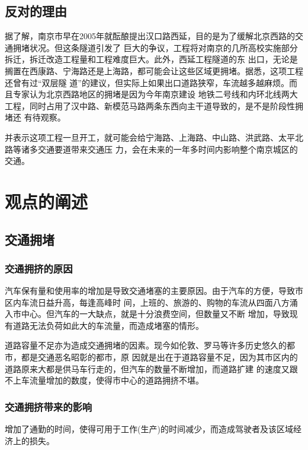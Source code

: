 ﻿\documentclass[11pt,a4paper,onecolumn]{article}
\begin{document}
\subsection{反对的理由}

据了解，南京市早在2005年就酝酿提出汉口路西延，目的是为了缓解北京西路的交通拥堵状况。但这条隧道引发了
巨大的争议，工程将对南京的几所高校实施部分拆迁，拆迁改造工程量和工程难度巨大。此外，西延工程隧道的东
出口，无论是搁置在西康路、宁海路还是上海路，都可能会让这些区域更拥堵。据悉，这项工程还曾有过“双层隧
道”的建议，但实际上如果出口道路狭窄，车流越多越麻烦。而且专家认为北京西路地区的拥堵是因为今年南京建设
地铁二号线和内环北线两大工程，同时占用了汉中路、新模范马路两条东西向主干道导致的，是不是阶段性拥堵还
有待观察。

并表示这项工程一旦开工，就可能会给宁海路、上海路、中山路、洪武路、太平北路等诸多交通要道带来交通压
力，会在未来的一年多时间内影响整个南京城区的交通。

\section{观点的阐述}

\subsection{交通拥堵}

\subsubsection{交通拥挤的原因}

汽车保有量和使用率的增加是导致交通堵塞的主要原因。由于汽车的方便，导致市区内车流日益升高，每逢高峰时
间，上班的、旅游的、购物的车流从四面八方涌入市中心。但汽车的一大缺点，就是十分浪费空间，但数量又不断
增加，导致现有道路无法负荷如此大的车流量，而造成堵塞的情形。

道路容量不足亦为造成交通拥堵的因素。现今如伦敦、罗马等许多历史悠久的都市，都是交通恶名昭彰的都市，原
因就是出在于道路容量不足，因为其市区内的道路原来大都是供马车行走的，但汽车的数量不断增加，而道路扩建
的速度又跟不上车流量增加的数度，使得市中心的道路拥挤不堪。

\subsubsection{交通拥挤带来的影响}

增加了通勤的时间，使得可用于工作(生产)的时间减少，而造成驾驶者及该区域经济上的损失。
\end{document}
